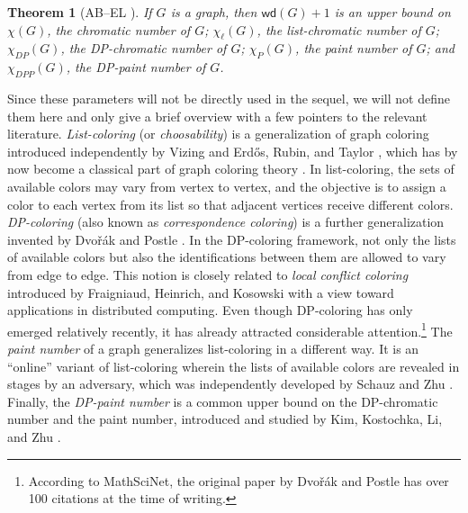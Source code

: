 \documentclass[11pt]{article}
\theoremstyle{slantthm}
\newtheorem{thm}{Theorem}[section]
\numberwithin{equation}{section}
\theoremstyle{definition}
\newcommand\red[1]{\textcolor{cr}{#1}}
\newcommand{\bemph}[1]{{\normalfont#1}}
\newcommand{\ep}[1]{\bemph{(}#1\bemph{)}}
\renewcommand{\red}[1]{{\color{red}#1}}
\newcommand{\todo}[1]{\red{\textbf{[#1]}}}
\numberwithin{equation}{section}
\newcommand{\0}{\varnothing}
\newcommand{\wde}{\mathsf{wd}}
\begin{document}
    \begin{thm}[{AB--EL \cite[Proposition 1.3]{WD}}]\label{thm:wd+1}
        If $G$ is a graph, then $\wde(G) + 1$ is an upper bound on $\chi(G)$, the chromatic number of $G$; $\chi_\ell(G)$, the list-chromatic number of $G$; $\chi_{DP}(G)$, the DP-chromatic number of $G$; $\chi_{P}(G)$, the paint number of $G$; and $\chi_{DPP}(G)$, the DP-paint number of $G$.
    \end{thm}

    Since these parameters will not be directly used in the sequel, we will not define them here and only give a brief overview with a few pointers to the relevant literature. \emph{List-coloring} (or \emph{choosability}) is a generalization of graph coloring introduced independently by Vizing \cite{Viz} and Erd\H{o}s, Rubin, and Taylor \cite{ERT}, which has by now become a classical part of graph coloring theory \cites[\S14.5]{BondyMurty}[\S5.4]{Diestel}. In list-coloring, the sets of available colors may vary from vertex to vertex, and the objective is to assign a color to each vertex from its list so that adjacent vertices receive different colors. \emph{DP-coloring} \ep{also known as \emph{correspondence coloring}} is a further generalization invented by Dvo\v{r}\'ak and Postle \cite{DP}. In the DP-coloring framework, not only the lists of available colors but also the identifications between them are allowed to vary from edge to edge. This notion is closely related to \emph{local conflict coloring} introduced by Fraigniaud, Heinrich, and Kosowski \cite{FHK} with a view toward applications in distributed computing. Even though DP-coloring has only emerged relatively recently, it has already attracted considerable attention.\footnote{According to MathSciNet, the original paper \cite{DP} by Dvo\v{r}\'ak and Postle has over 100 citations at the time of writing.} The \emph{paint number} of a graph generalizes list-coloring in a different way. It is an ``online'' variant of list-coloring wherein the lists of available colors are revealed in stages by an adversary, which was %
    independently developed by Schauz \cite{Schauz} and Zhu \cite{Zhu}. %
    Finally, the \emph{DP-paint number} is a common upper bound on the DP-chromatic number and the paint number, introduced and studied by Kim, Kostochka, Li, and Zhu \cite{Paint}.
\end{document}

